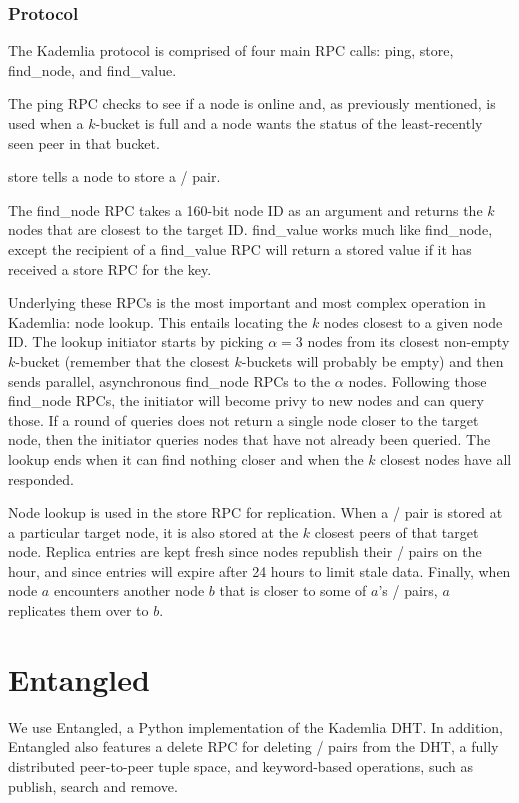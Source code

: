 \documentclass[12pt,twocolumn]{article}
\begin{document}
\subsubsection{Protocol}

\newcommand{\findNode}{}
\def\findNode/{{\sc find\_node}}
\newcommand{\findValue}{}
\def\findValue/{{\sc find\_value}}
\newcommand{\ping}{}
\def\ping/{{\sc ping}}
\newcommand{\store}{}
\def\store/{{\sc store}}

The Kademlia protocol is comprised of four main RPC calls: \ping/, \store/, \findNode/, and \findValue/.

The \ping/ RPC checks to see if a node is online and, as previously mentioned, is used when a $k$-bucket is full and a node wants the status of the least-recently seen peer in that bucket.

\store/ tells a node to store a \kv/ pair.

The \findNode/ RPC takes a 160-bit node ID as an argument and returns the $k$ nodes that are closest to the target ID. \findValue/ works much like \findNode/, except the recipient of a \findValue/ RPC will return a stored value if it has received a \store/ RPC for the key.

Underlying these RPCs is the most important and most complex operation in Kademlia: node lookup. This entails locating the $k$ nodes closest to a given node ID. The lookup initiator starts by picking $\alpha = 3$ nodes from its closest non-empty $k$-bucket (remember that the closest $k$-buckets will probably be empty) and then sends parallel, asynchronous \findNode/ RPCs to the $\alpha$ nodes. Following those \findNode/ RPCs, the initiator will become privy to new nodes and can query those. If a round of queries does not return a single node closer to the target node, then the initiator queries nodes that have not already been queried. The lookup ends when it can find nothing closer and when the $k$ closest nodes have all responded.

Node lookup is used in the \store/ RPC for replication. When a \kv/ pair is stored at a particular target node, it is also stored at the $k$ closest peers of that target node. Replica entries are kept fresh since nodes republish their \kv/ pairs on the hour, and since entries will expire after 24 hours to limit stale data. Finally, when node $a$ encounters another node $b$ that is closer to some of $a$'s \kv/ pairs, $a$ replicates them over to $b$.

\section{Entangled}
\newcommand{\delete}{}
\def\delete/{{\sc delete}}
We use Entangled, a Python implementation of the Kademlia DHT.
In addition, Entangled also features a \delete/ RPC for deleting \kv/ pairs from the DHT, a fully distributed peer-to-peer tuple space, and keyword-based operations, such as publish, search and remove.
\end{document}
